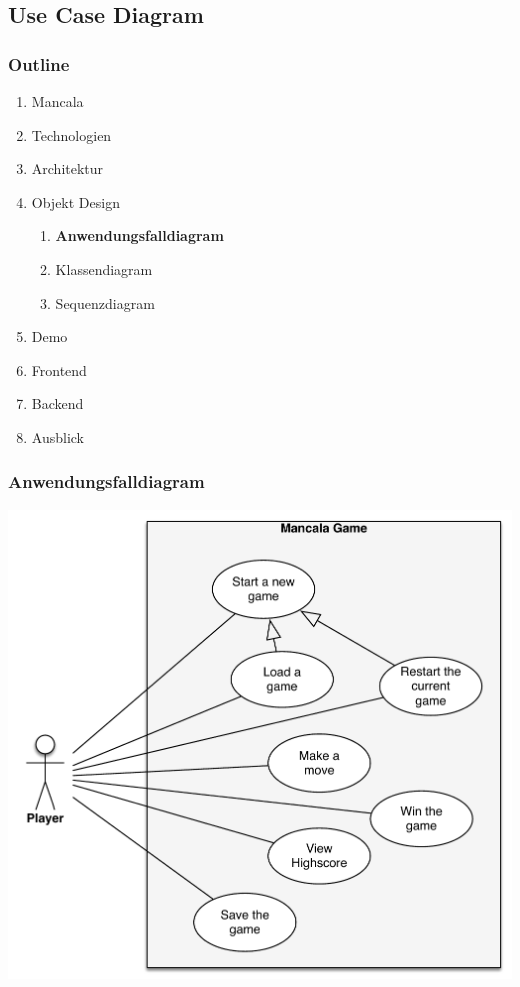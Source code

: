 \documentclass[
	10pt,
	t		%
]{beamer}
\begin{document}
\subsection{Use Case Diagram}
\begin{frame}
\frametitle{Outline}
\begin{enumerate}
\item Mancala
\item Technologien
\item Architektur
\item Objekt Design
\begin{enumerate}
\item \textbf{Anwendungsfalldiagram}
\item Klassendiagram
\item Sequenzdiagram
\end{enumerate}
\item Demo
\item Frontend
\item Backend
\item Ausblick
\end{enumerate}
\end{frame}

\begin{frame}
\frametitle{Anwendungsfalldiagram}
\begin{center}
\includegraphics[scale=0.32]{./../Diagrams/UseCases.pdf}
\end{center}
\end{frame}
\end{document}
